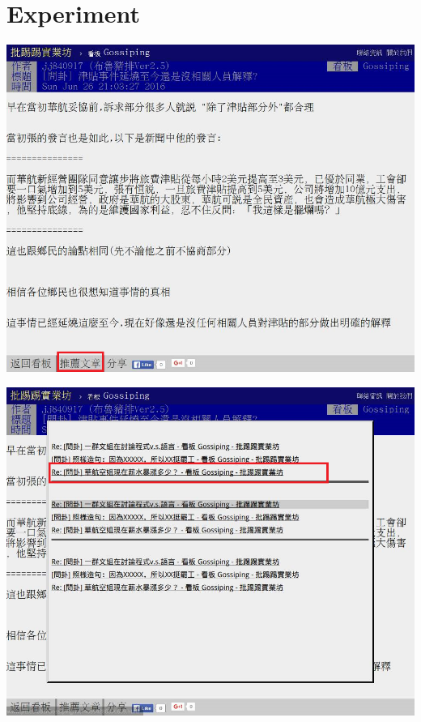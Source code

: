 \documentclass[a4paper, 10pt,twocolumn]{article} %
\begin{document}
\section{Experiment}
\begin{center}
\includegraphics[scale=0.5]{experiment1.png}
\end{center}
\begin{center}
\includegraphics[scale=0.5]{experiment2.png}
\end{center}
\end{document}
